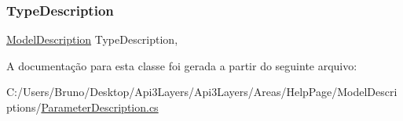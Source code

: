 \subsubsection{\texorpdfstring{Type\+Description}{TypeDescription}}
{\footnotesize\ttfamily \hyperlink{classApi3Layers_1_1Areas_1_1HelpPage_1_1ModelDescriptions_1_1ModelDescription}{Model\+Description} Type\+Description\hspace{0.3cm}{\ttfamily [get]}, {\ttfamily [set]}}



A documentação para esta classe foi gerada a partir do seguinte arquivo\+:\begin{DoxyCompactItemize}
\item 
C\+:/\+Users/\+Bruno/\+Desktop/\+Api3\+Layers/\+Api3\+Layers/\+Areas/\+Help\+Page/\+Model\+Descriptions/\hyperlink{ParameterDescription_8cs}{Parameter\+Description.\+cs}\end{DoxyCompactItemize}
